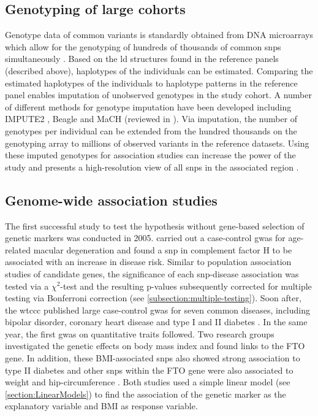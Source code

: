 \subsection{Genotyping of large cohorts}
Genotype data of common variants is standardly obtained from DNA microarrays which allow for the genotyping of hundreds of thousands of common \glspl{snp} simultaneously \citep{Wang1998}. Based on the \gls{ld} structures found in the reference panels (described above), haplotypes of the individuals can be estimated. Comparing the estimated haplotypes of the individuals to haplotype patterns in the reference panel enables imputation of unobserved genotypes in the study cohort. A number of different methods for genotype imputation have been developed including IMPUTE2 \citep{Howie2009}, Beagle \citep{Browning2007} and MaCH \citep{Li2010} (reviewed in \citep{Marchini2010}). Via imputation, the number of genotypes per individual can be extended from the hundred thousands on the genotyping array to millions of observed variants in the reference datasets. Using these imputed genotypes for association studies can increase the power of the study and presents a high-resolution view of all \glspl{snp} in the associated region \citep{Marchini2010}.

\subsection{Genome-wide association studies}
\label{subsection:GWAS}
The first successful study to test the  hypothesis without gene-based selection of genetic markers was conducted in 2005. \citet{Klein2005} carried out a case-control \gls{gwas} for age-related macular degeneration and found a \gls{snp} in complement factor H to be associated with an increase in disease risk. Similar to population association studies of candidate genes, the significance of each \gls{snp}-disease association was tested via a \(\chi ^2\)-test and the resulting p-values subsequently corrected for multiple testing via Bonferroni correction (see \cref{subsection:multiple-testing}). Soon after, the \gls{wtccc} published large case-control \gls{gwas} for seven common diseases, including bipolar disorder, coronary heart disease and type I and II diabetes \citep{Burton2007}. In the same year, the first \gls{gwas} on quantitative traits followed. Two research groups investigated the genetic effects on body mass index and found links to the FTO gene. In addition, these BMI-associated \glspl{snp} also showed strong association to type II diabetes \citep{Frayling2007} and other \glspl{snp} within the FTO gene were also associated to weight and hip-circumference \citep{Scuteri2007}. Both studies used a simple linear model  (see \cref{section:LinearModels}) to find the association of the genetic marker as the explanatory variable and BMI as response variable. 

